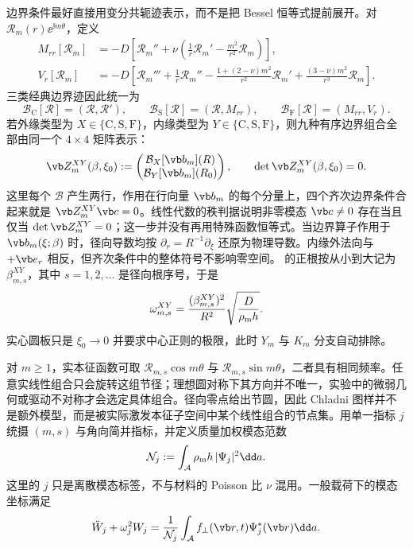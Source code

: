 边界条件最好直接用变分共轭迹表示，而不是把 Bessel 恒等式提前展开。对 \(\mathcal R_m(r)\ee^{\ii m\theta}\)，定义
\begin{align*}
 M_{rr}[\mathcal R_m]
 &=-D\left[\mathcal R_m''
 +\nu\left(\frac1r\mathcal R_m'-\frac{m^2}{r^2}\mathcal R_m\right)\right],\\
 V_r[\mathcal R_m]
 &=-D\left[\mathcal R_m'''
 +\frac1r\mathcal R_m''
 -\frac{1+(2-\nu)m^2}{r^2}\mathcal R_m'
 +\frac{(3-\nu)m^2}{r^3}\mathcal R_m\right].
\end{align*}
三类经典边界迹因此统一为
\[
 \mathcal B_{\mathrm C}[\mathcal R]=(\mathcal R,\mathcal R'),
 \qquad
 \mathcal B_{\mathrm S}[\mathcal R]=(\mathcal R,M_{rr}),
 \qquad
 \mathcal B_{\mathrm F}[\mathcal R]=(M_{rr},V_r).
\]
若外缘类型为 \(X\in\{\mathrm C,\mathrm S,\mathrm F\}\)，内缘类型为 \(Y\in\{\mathrm C,\mathrm S,\mathrm F\}\)，则九种有序边界组合全部由同一个 \(4\times4\) 矩阵表示：
\begin{equation}
 \vb Z_m^{XY}(\beta,\xi_0)
 :=\begin{pmatrix}
 \mathcal B_X[\vb b_m](R)\\
 \mathcal B_Y[\vb b_m](R_0)
 \end{pmatrix},
 \qquad
 \det\vb Z_m^{XY}(\beta,\xi_0)=0.
 \label{eq:phys-sm-annulus-characteristic}
\end{equation}
这里每个 \(\mathcal B\) 产生两行，作用在行向量 \(\vb b_m\) 的每个分量上，四个齐次边界条件合起来就是 \(\vb Z_m^{XY}\vb c=0\)。线性代数的秩判据说明非零模态 \(\vb c\ne0\) 存在当且仅当 \(\det\vb Z_m^{XY}=0\)；这一步并没有再用特殊函数恒等式。当边界算子作用于 \(\vb b_m(\xi;\beta)\) 时，径向导数均按 \(\partial_r=R^{-1}\partial_\xi\) 还原为物理导数。内缘外法向与 \(+\vb e_r\) 相反，但齐次条件中的整体符号不影响零空间。 的正根按从小到大记为 \(\beta_{m,s}^{XY}\)，其中 \(s=1,2,\ldots\) 是径向根序号，于是
\begin{equation}
 \omega_{m,s}^{XY}
 =\frac{(\beta_{m,s}^{XY})^2}{R^2}
 \sqrt{\frac{D}{\rho_{\rm m} h}}.
 \label{eq:phys-sm-annulus-frequency}
\end{equation}
实心圆板只是 \(\xi_0\to0\) 并要求中心正则的极限，此时 \(Y_m\) 与 \(K_m\) 分支自动排除。

对 \(m\ge1\)，实本征函数可取 \(\mathcal R_{m,s}\cos m\theta\) 与 \(\mathcal R_{m,s}\sin m\theta\)，二者具有相同频率。任意实线性组合只会旋转这组节径；理想圆对称下其方向并不唯一，实验中的微弱几何或驱动不对称才会选定具体组合。径向零点给出节圆，因此 Chladni 图样并不是额外模型，而是被实际激发本征子空间中某个线性组合的节点集。用单一指标 \(j\) 统摄 \((m,s)\) 与角向简并指标，并定义质量加权模态范数
\[
 \mathcal N_j
 :=\int_{\mathcal A}\rho_{\rm m} h\,|\Psi_j|^2\dd a.
\]
这里的 \(j\) 只是离散模态标签，不与材料的 Poisson 比 \(\nu\) 混用。一般载荷下的模态坐标满足
\begin{equation}
 \ddot W_j+\omega_j^2W_j
 =\frac{1}{\mathcal N_j}
 \int_{\mathcal A}f_\perp(\vb r,t)\Psi_j^*(\vb r)\dd a.
 \label{eq:phys-sm-annulus-modal-dynamics}
\end{equation}

